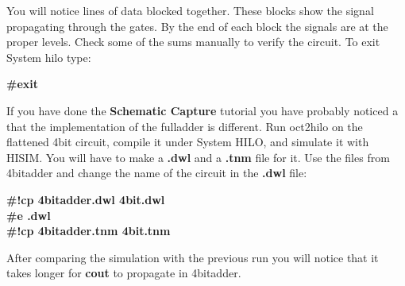   You will notice lines of data blocked together.  These blocks
show the signal propagating through the gates.  By the end of
each block the signals are at the proper levels.  Check some 
of the sums manually to verify the circuit.  To exit System
hilo type:

{\bf   \#exit}
  
  If you have done the {\bf Schematic Capture} tutorial you have probably
noticed a that the implementation of the fulladder is different.  Run
oct2hilo on the flattened 4bit circuit, compile it under System HILO,
and simulate it with HISIM.  You will have to make a {\bf .dwl} 
and a {\bf .tnm} file for it.  Use the files from 4bitadder and 
change the name of the circuit in the {\bf .dwl} file:

{\bf   \#!cp 4bitadder.dwl 4bit.dwl}\\
{\bf   \#e .dwl}\\
{\bf   \#!cp 4bitadder.tnm 4bit.tnm}

  After comparing the simulation with the previous run you will
notice that it takes longer for {\bf cout} to propagate in 4bitadder.





